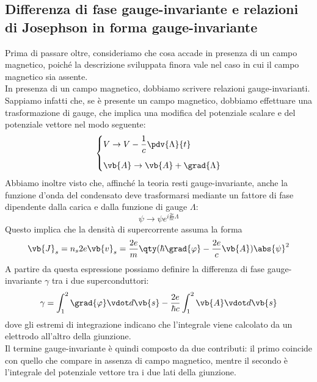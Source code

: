 \subsection{Differenza di fase gauge-invariante e relazioni di Josephson in forma gauge-invariante}
Prima di passare oltre, consideriamo che cosa accade in presenza di un campo magnetico, poiché la descrizione sviluppata finora vale nel caso in cui il campo magnetico sia assente.\\
In presenza di un campo magnetico, dobbiamo scrivere relazioni gauge-invarianti. Sappiamo infatti che, se è presente un campo magnetico, dobbiamo effettuare una trasformazione di gauge, che implica una modifica del potenziale scalare e del potenziale vettore nel modo seguente:
\begin{equation*}
    \begin{dcases}
        V \to V - \frac{1}{c} \pdv{\Lambda}{t}
        \\[0.2cm]
        \vb{A} \to \vb{A} + \grad{\Lambda}
    \end{dcases}
\end{equation*}
Abbiamo inoltre visto che, affinché la teoria resti gauge-invariante, anche la funzione d'onda del condensato deve trasformarsi mediante un fattore di fase dipendente dalla carica e dalla funzione di gauge $\Lambda$:
\begin{equation*}
    \psi \to \psi e^{i \frac{2e}{\hbar c} \Lambda}
\end{equation*}
Questo implica che la densità di supercorrente assuma la forma
\begin{equation*}
    \vb{J}_s
    =n_s 2e \vb{v}_s
    =\frac{2e}{m}\qty(\hbar \grad{\varphi} - \frac{2e}{c}\vb{A}) \abs{\psi}^2
\end{equation*}
A partire da questa espressione possiamo definire la differenza di fase gauge-invariante $\gamma$ tra i due superconduttori:
\begin{equation*}
    \gamma
    =
    \int_{1}^{2}
    \grad{\varphi}\vdot d\vb{s}
    -
    \frac{2e}{\hbar c}
    \int_{1}^{2}
    \vb{A}\vdot d\vb{s}
\end{equation*}
dove gli estremi di integrazione indicano che l'integrale viene calcolato da un elettrodo all'altro della giunzione.\\
Il termine gauge-invariante è quindi composto da due contributi: il primo coincide con quello che compare in assenza di campo magnetico, mentre il secondo è l'integrale del potenziale vettore tra i due lati della giunzione.\\
